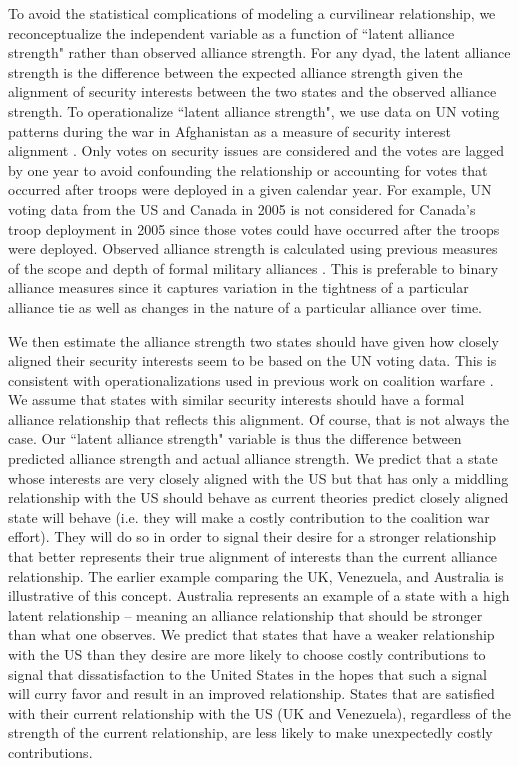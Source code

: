 \documentclass[12pt,letterpaper]{article}
\begin{document}
		To avoid the statistical complications of modeling a curvilinear relationship, we reconceptualize the independent variable as a function of ``latent alliance strength" rather than observed alliance strength. For any dyad, the latent alliance strength is the difference between the expected alliance strength given the alignment of security interests between the two states and the observed alliance strength. To operationalize ``latent alliance strength", we use data on UN voting patterns during the war in Afghanistan as a measure of security interest alignment \citep{bailey_estimatingdynamicstate_2017}. Only votes on security issues are considered and the votes are lagged by one year to avoid confounding the relationship or accounting for votes that occurred after troops were deployed in a given calendar year. For example, UN voting data from the US and Canada in 2005 is not considered for Canada's troop deployment in 2005 since those votes could have occurred after the troops were deployed. Observed alliance strength is calculated using previous measures of the scope and depth of formal military alliances \citep{benson_assessingvariationformal_2016}. This is preferable to binary alliance measures since it captures variation in the tightness of a particular alliance tie as well as changes in the nature of a particular alliance over time.
		
		We then estimate the alliance strength two states should have given how closely aligned their security interests seem to be based on the UN voting data. This is consistent with operationalizations used in previous work on coalition warfare \citep{wolford_politicsmilitarycoalitions_2015}. We assume that states with similar security interests should have a formal alliance relationship that reflects this alignment. Of course, that is not always the case. Our ``latent alliance strength" variable is thus the difference between predicted alliance strength and actual alliance strength. We predict that a state whose interests are very closely aligned with the US but that has only a middling relationship with the US should behave as current theories predict closely aligned state will behave (i.e. they will make a costly contribution to the coalition war effort). They will do so in order to signal their desire for a stronger relationship that better represents their true alignment of interests than the current alliance relationship. The earlier example comparing the UK, Venezuela, and Australia is illustrative of this concept. Australia represents an example of a state with a high latent relationship -- meaning an alliance relationship that should be stronger than what one observes. We predict that states that have a weaker relationship with the US than they desire are more likely to choose costly contributions to signal that dissatisfaction to the United States in the hopes that such a signal will curry favor and result in an improved relationship. States that are satisfied with their current relationship with the US (UK and Venezuela), regardless of the strength of the current relationship, are less likely to make unexpectedly costly contributions.
\end{document}
